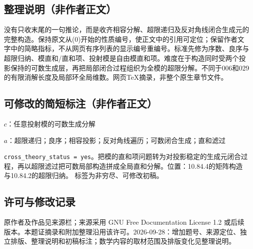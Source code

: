 \documentclass[UTF8,11pt]{ctexart}
\theoremstyle{definition}
\begin{document}
\subsection*{整理说明（非作者正文）}
没有只收末尾的一句推论，而是收齐相容分解、超限递归及反对角线闭合生成元的完整构造。保持原文从(0)开始的性质编号，使正文中的引用可定位；保留作者文字中的简略指标，不从网页有序列表的显示编号重编号。标准先修为序数、良序与超限归纳、模直和/直和项、投射模是自由模直和项。难度在于构造同时受两个投影保持的可数生成层，再把局部闭合过程组织为全模的超限分解。不同于006和029的有限消解长度及局部环全局维数。网页TeX摘录，非整个原生章节文件。
\subsection*{可修改的简短标注（非作者正文）}
$c$：任意投射模的可数生成分解

$a$：超限递归；良序；相容投影；反对角线遍历；可数闭合生成；直和滤过

\texttt{cross\_theory\_status = yes}。把模的直和项问题转为对投影稳定的生成元闭合过程，再以超限滤过把可数局部构造拼成全局直和分解。位置：10.84.4的矩阵构造与10.84.2的超限归纳。
标签为非穷尽、可修改初稿。
\subsection*{许可与修改记录}
原作者及作品见来源栏；来源采用 GNU Free Documentation License 1.2 或后续版本。本题证摘录和附加整理沿用该许可。2026-09-28：增加题号、来源定位、独立排版、整理说明和初稿标注；数学内容的取材范围及排版变化见整理说明。
\end{document}
